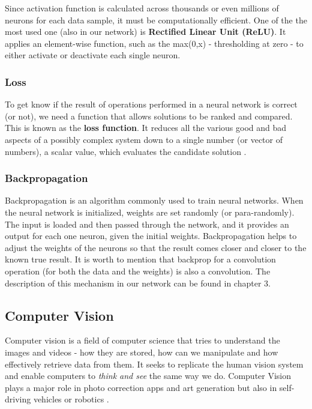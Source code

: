 \documentclass[../Main.tex]{subfiles}
\begin{document}
    Since activation function is calculated across thousands or even millions of neurons for each data sample, it must be computationally efficient. One of the the most used one (also in our network) is \textbf{Rectified Linear Unit (ReLU)}. It applies an element-wise function, such as the max(0,x) - thresholding at zero - to either activate or deactivate each single neuron.

    \subsubsection{Loss}
    To get know if the result of operations performed in a neural network is correct (or not), we need a function that allows solutions to be ranked and compared. This is known as the \textbf{loss function}. It reduces all the various good and bad aspects of a possibly complex system down to a single number (or vector of numbers), a scalar value, which evaluates the candidate solution \cite{neuralsmithingbook}. 
    
    \subsubsection{Backpropagation}
    Backpropagation is an algorithm commonly used to train neural networks. When the neural network is initialized, weights are set randomly (or para-randomly). The input is loaded and then passed through the network, and it provides an output for each one neuron, given the initial weights. Backpropagation helps to adjust the weights of the neurons so that the result comes closer and closer to the known true result. It is worth to mention that backprop for a convolution operation (for both the data and the weights) is also a convolution. The description of this mechanism in our network can be found in chapter 3.

\subsection{Computer Vision}
    Computer vision is a field of computer science that tries to understand the images and videos - how they are stored, how can we manipulate and how effectively retrieve data from them. It seeks to replicate the human vision system and enable computers to \textit{think and see} the same way we do. Computer Vision plays a major role in photo correction apps and art generation but also in self-driving vehicles or robotics \cite{towardsdatascience}.
    
\end{document}
